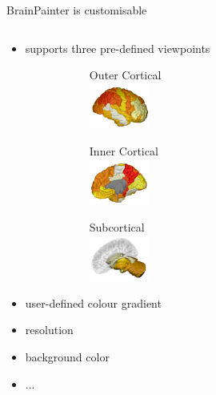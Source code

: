 \documentclass[10pt,xcolor=table,aspectratio=169]{beamer}
\begin{document}
\begin{frame}[t]{BrainPainter is customisable}
\begin{columns}[t]
\begin{column}{0.5\textwidth}
 \begin{itemize}
   \item supports three pre-defined viewpoints
      \begin{figure}
    \fontsize{8}{10}\selectfont
     \begin{subfigure}{0.25\textwidth}
      \centering
      Outer Cortical\\
      \includegraphics[height=1.5cm]{images/DK_output/Image_2_cortical-outer.png}
     \end{subfigure}
     \begin{subfigure}{0.25\textwidth}
      \centering
      Inner Cortical\\
      \includegraphics[height=1.5cm]{images/DK_output/Image_2_cortical-inner.png}
     \end{subfigure}
     \begin{subfigure}{0.25\textwidth}
      \centering
      Subcortical\\
      \includegraphics[height=1.5cm]{images/DK_output/Image_2_subcortical.png}
     \end{subfigure}

   \end{figure}
   
   \vspace{2em}
   
      
   
   \item user-defined colour gradient
   \item resolution
   \item background color
   \item ...
   
   

  \end{itemize}



\end{column}
\end{columns}

  

\end{frame}
 
\end{document}
